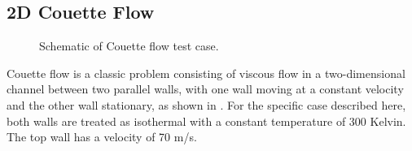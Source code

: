 \FINALFIX{\newpage}
\subsection{2D Couette Flow}
\label{SEC:Testcases:CouetteFlow}

\begin{figure}[htb]
  \begin{centering}
    \caption[Couette flow test case.]{Schematic of Couette flow test case.}
    \label{FIG:CouetteFlowSchematic}
  \end{centering}
\end{figure}

Couette flow is a classic problem consisting of viscous flow in a
two-dimensional channel between two parallel walls, with one wall
moving at a constant velocity and the other wall stationary,
as shown in .
%
For the specific case described here, both walls are treated as
isothermal with a constant temperature of 300 Kelvin.
%
The top wall has a velocity of 70 m/s.

%

